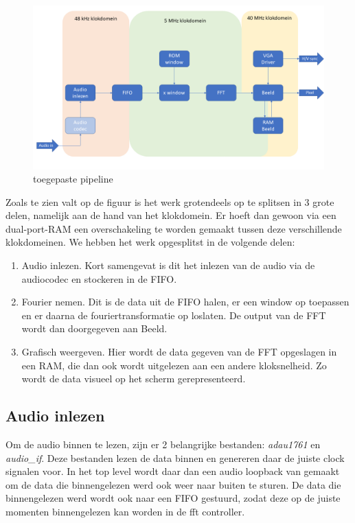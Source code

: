 \documentclass[a4paper,kul]{kulakarticle} %
\begin{document}
\begin{figure}[H]
	\centering
	\includegraphics[width=0.7\linewidth]{Pipeline.png}
	\caption{toegepaste pipeline}
	\label{fig:toegepastePipeline}
\end{figure}

Zoals te zien valt op de figuur is het werk grotendeels op te splitsen in 3 grote delen, namelijk aan de hand van het klokdomein. Er hoeft dan gewoon via een dual-port-RAM een overschakeling te worden gemaakt tussen deze verschillende klokdomeinen. We hebben het werk opgesplitst in de volgende delen:

\begin{enumerate}
	\item Audio inlezen. Kort samengevat is dit het inlezen van de audio via de audiocodec en stockeren in de FIFO.
	\item Fourier nemen. Dit is de data uit de FIFO halen, er een window op toepassen en er daarna de fouriertransformatie op loslaten. De output van de FFT wordt dan doorgegeven aan Beeld.
	\item Grafisch weergeven. Hier wordt de data gegeven van de FFT opgeslagen in een RAM, die dan ook wordt uitgelezen aan een andere kloksnelheid. Zo wordt de data visueel op het scherm gerepresenteerd.
\end{enumerate}

\subsection{Audio inlezen}

Om de audio binnen te lezen, zijn er 2 belangrijke bestanden: \textit{adau1761} en \textit{audio\_if}. Deze bestanden lezen de data binnen en genereren daar de juiste clock signalen voor. In het top level wordt daar dan een audio loopback van gemaakt om de data die binnengelezen werd ook weer naar buiten te sturen. De data die binnengelezen werd wordt ook naar een FIFO gestuurd, zodat deze op de juiste momenten binnengelezen kan worden in de fft controller.
\end{document}
